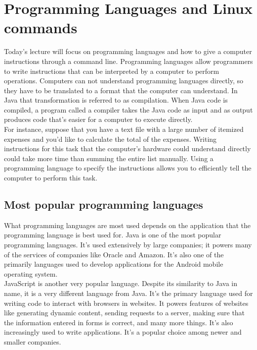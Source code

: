 \chapter{Programming Languages and Linux commands}

Today's lecture will focus on programming languages and how to give a computer instructions through a command line. Programming languages allow programmers to write instructions that can be interpreted by a computer to perform operations. Computers can not understand programming languages directly, so they have to be translated to a format that the computer can understand. In Java that transformation is referred to as compilation. When Java code is compiled, a program called a compiler takes the Java code as input and as output produces code that’s easier for a computer to execute directly. \\

For instance, suppose that you have a text file with a large number of itemized expenses and you’d like to calculate the total of the expenses. Writing instructions for this task that the computer’s hardware could understand directly could take more time than summing the entire list manually. Using a programming language to specify the instructions allows you to efficiently tell the computer to perform this task. \\ 

\section{Most popular programming languages}

What programming languages are most used depends on the application that the programming language is best used for. Java is one of the most popular programming languages. It’s used extensively by large companies; it powers many of the services of companies like Oracle and Amazon. It’s also one of the primarily languages used to develop applications for the Android mobile operating system. \\

JavaScript is another very popular language. Despite its similarity to Java in name, it is a very different language from Java. It’s the primary language used for writing code to interact with browsers in websites. It powers features of websites like generating dynamic content, sending requests to a server, making sure that the information entered in forms is correct, and many more things. It’s also increasingly used to write applications. It’s a popular choice among newer and smaller companies. \\

